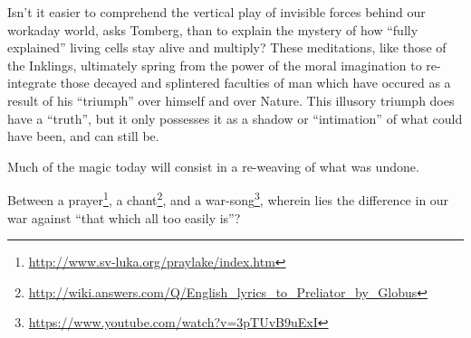 Isn't it easier to comprehend the vertical play of invisible forces behind our workaday world, asks Tomberg, than to explain the mystery of how ``fully explained'' living cells stay alive and multiply? These meditations, like those of the Inklings, ultimately spring from the power of the moral imagination to re-integrate those decayed and splintered faculties of man which have occured as a result of his ``triumph'' over himself and over Nature. This illusory triumph does have a ``truth'', but it only possesses it as a shadow or ``intimation'' of what could have been, and can still be.

Much of the magic today will consist in a re-weaving of what was undone.

Between a prayer\footnote{\url{http://www.sv-luka.org/praylake/index.htm}}, a chant\footnote{\url{http://wiki.answers.com/Q/English\_lyrics\_to\_Preliator\_by\_Globus}}, and a war-song\footnote{\url{https://www.youtube.com/watch?v=3pTUvB9uExI}}, wherein lies the difference in our war against ``that which all too easily is''?



